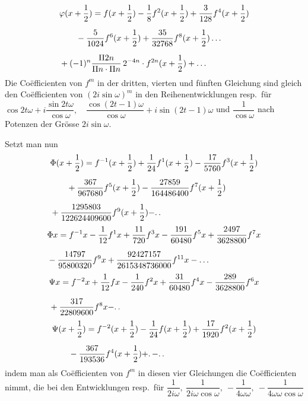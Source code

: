 \[
\begin{aligned}
&\varphi(x+\frac12)={}f(x+\frac12)-\frac18f^{2}(x+\frac12)
+\frac{3}{128}f^{4}(x+\frac12)\\[6pt]
&\qquad{}-\frac{5}{1024}f^{6}(x+\frac12)
+\frac{35}{32768}f^{8}(x+\frac12)\mathinner{.\,.\,.}\\[6pt]
&+(-1)^n\frac{\Pi 2n}{\Pi n\cdot\Pi n}\,2^{-4n}\cdot f^{2n}(x+\frac12)+\mathinner{.\,.\,.}
\end{aligned}
\]
Die Coëfficienten von $f^m$ in der dritten, vierten und fünften Gleichung sind gleich den Coëfficienten von
$(2i\sin\omega)^m$ in den Reihenentwicklungen resp.\ für
$\cos 2t\omega+i\dfrac{\sin 2t\omega}{\cos\omega},\allowbreak \quad
\dfrac{\cos(2t-1)\omega}{\cos\omega}+i\sin(2t-1)\omega$
und $\dfrac{1}{\cos\omega}$ nach Potenzen der Grösse $2i\sin\omega$.
\par{}
Setzt man nun
\[
\begin{aligned}
&\Phi(x+\frac12)={}f^{-1}(x+\frac12)+\frac{1}{24}f^{1}(x+\frac12)
-\frac{17}{5760}f^{3}(x+\frac12)\\[6pt]
&\qquad{}+\frac{367}{967680}f^{5}(x+\frac12)
-\frac{27859}{164486400}f^{7}(x+\frac12)\\[6pt]
&+\frac{1295803}{122624409600}f^{9}(x+\frac12)-\ldotp\ldotp
\end{aligned}
\]
\[
\begin{aligned}
&\Phi x={}f^{-1}x-\frac{1}{12}f^{1}x+\frac{11}{720}f^{3}x
-\frac{191}{60480}f^{5}x+\frac{2497}{3628800}f^{7}x\\[6pt]
&-\frac{14797}{95800320}f^{9}x+\frac{92427157}{2615348736000}f^{11}x-\mathinner{.\,.\,.}
\end{aligned}
\]
\[
\begin{aligned}
&\Psi x={}f^{-2}x+\frac{1}{12}fx-\frac{1}{240}f^{2}x
+\frac{31}{60480}f^{4}x-\frac{289}{3628800}f^{6}x\\[6pt]
&+\frac{317}{22809600}f^{8}x-\ldotp\ldotp
\end{aligned}
\]
\[
\begin{aligned}
&\Psi(x+\frac12)=f^{-2}(x+\frac12)-\frac{1}{24}f(x+\frac12)
+\frac{17}{1920}f^{2}(x+\frac12)\\[6pt]
&\qquad{}-\frac{367}{193536}f^{4}(x+\frac12)+\ldotp-\ldotp\ldotp
\end{aligned}
\]
indem man als Coëfficienten von $f^m$ in diesen vier Gleichungen die Coëfficienten nimmt, die bei den
Entwicklungen resp.\ für
$\dfrac{1}{2i\omega},\allowbreak \ \dfrac{1}{2i\omega\cos\omega},\allowbreak \ -\dfrac{1}{4\omega\omega},\allowbreak \ -\dfrac{1}{4\omega\omega\cos\omega}$

